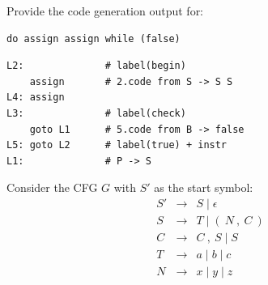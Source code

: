 \documentclass[12pt]{article}
\begin{document}
\begin{exe}
\begin{xlist}
{\ex Provide the code generation output for:
{\small
\begin{verbatim}
do assign assign while (false)
\end{verbatim}
}
\begin{soln}
{\small
\begin{verbatim}
L2:              # label(begin)
    assign       # 2.code from S -> S S
L4: assign
L3:              # label(check)
    goto L1      # 5.code from B -> false
L5: goto L2      # label(true) + instr
L1:              # P -> S
\end{verbatim}
}
\end{soln}
}

\end{xlist}


\newpage

\ex\label{tree} Consider the CFG $G$ with $S'$ as the start symbol:
\begin{eqnarray}
S' & \rightarrow & S \mid \epsilon \nonumber\\
S  & \rightarrow & T \mid (\ N\ ,\ C\ ) \nonumber\\
C  & \rightarrow & C\ ,\ S \mid S \nonumber\\
T  & \rightarrow & a \mid b \mid c \nonumber\\
N  & \rightarrow & x \mid y \mid z \nonumber
\end{eqnarray}

\begin{xlist}

\end{xlist}
\end{exe}
\end{document}
